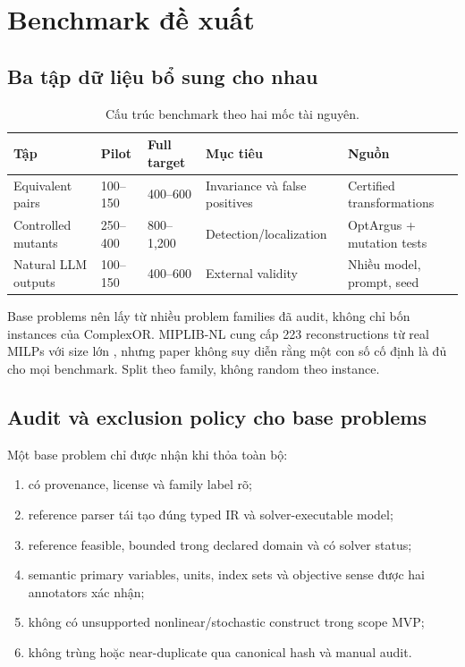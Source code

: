 \documentclass[11pt,a4paper]{article}
\begin{document}
\section{Benchmark đề xuất}

\subsection{Ba tập dữ liệu bổ sung cho nhau}

\begin{table}[htbp]
\centering
\caption{Cấu trúc benchmark theo hai mốc tài nguyên.}
\small
\begin{tabularx}{\textwidth}{L{2.7cm} L{1.5cm} L{1.7cm} Y Y}
\toprule
\textbf{Tập} & \textbf{Pilot} & \textbf{Full target} & \textbf{Mục tiêu} & \textbf{Nguồn} \\
\midrule
Equivalent pairs & 100--150 & 400--600 & Invariance và false positives & Certified transformations \\
Controlled mutants & 250--400 & 800--1,200 & Detection/localization & OptArgus + mutation tests \\
Natural LLM outputs & 100--150 & 400--600 & External validity & Nhiều model, prompt, seed \\
\bottomrule
\end{tabularx}
\end{table}

Base problems nên lấy từ nhiều problem families đã audit, không chỉ bốn
instances của ComplexOR. MIPLIB-NL cung cấp 223 reconstructions từ real MILPs
với size lớn \parencite{li2026miplibnl}, nhưng paper không suy diễn rằng một
con số cố định là đủ cho mọi benchmark. Split theo family, không random theo
instance.

\subsection{Audit và exclusion policy cho base problems}

Một base problem chỉ được nhận khi thỏa toàn bộ:

\begin{enumerate}
  \item có provenance, license và family label rõ;
  \item reference parser tái tạo đúng typed IR và solver-executable model;
  \item reference feasible, bounded trong declared domain và có solver status;
  \item semantic primary variables, units, index sets và objective sense được
  hai annotators xác nhận;
  \item không có unsupported nonlinear/stochastic construct trong scope MVP;
  \item không trùng hoặc near-duplicate qua canonical hash và manual audit.
\end{enumerate}
\end{document}
